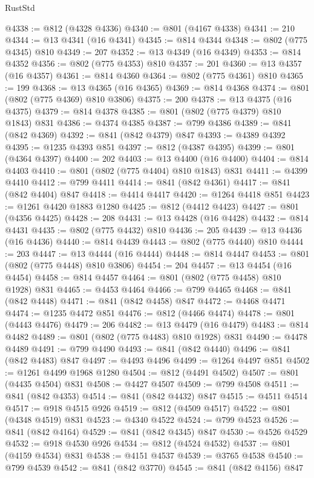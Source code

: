 \begin{lexlean}{RustStd}
\begin{coremodule}
@4338 := @812 (@4328 @4336)
@4340 := @801 (@4167 @4338)
@4341 := 210
@4344 := @13 @4341 (@16 @4341)
@4345 := @814 @4344
@4348 := @802 (@775 @4345) @810
@4349 := 207
@4352 := @13 @4349 (@16 @4349)
@4353 := @814 @4352
@4356 := @802 (@775 @4353) @810
@4357 := 201
@4360 := @13 @4357 (@16 @4357)
@4361 := @814 @4360
@4364 := @802 (@775 @4361) @810
@4365 := 199
@4368 := @13 @4365 (@16 @4365)
@4369 := @814 @4368
@4374 := @801 (@802 (@775 @4369) @810 @3806)
@4375 := 200
@4378 := @13 @4375 (@16 @4375)
@4379 := @814 @4378
@4385 := @801 (@802 (@775 @4379) @810 @1843) @831
@4386 := @4374 @4385
@4387 := @799 @4386
@4389 := @841 (@842 @4369)
@4392 := @841 (@842 @4379) @847
@4393 := @4389 @4392
@4395 := @1235 @4393 @851
@4397 := @812 (@4387 @4395)
@4399 := @801 (@4364 @4397)
@4400 := 202
@4403 := @13 @4400 (@16 @4400)
@4404 := @814 @4403
@4410 := @801 (@802 (@775 @4404) @810 @1843) @831
@4411 := @4399 @4410
@4412 := @799 @4411
@4414 := @841 (@842 @4361)
@4417 := @841 (@842 @4404) @847
@4418 := @4414 @4417
@4420 := @1264 @4418 @851
@4423 := @1261 @4420 @1883 @1280
@4425 := @812 (@4412 @4423)
@4427 := @801 (@4356 @4425)
@4428 := 208
@4431 := @13 @4428 (@16 @4428)
@4432 := @814 @4431
@4435 := @802 (@775 @4432) @810
@4436 := 205
@4439 := @13 @4436 (@16 @4436)
@4440 := @814 @4439
@4443 := @802 (@775 @4440) @810
@4444 := 203
@4447 := @13 @4444 (@16 @4444)
@4448 := @814 @4447
@4453 := @801 (@802 (@775 @4448) @810 @3806)
@4454 := 204
@4457 := @13 @4454 (@16 @4454)
@4458 := @814 @4457
@4464 := @801 (@802 (@775 @4458) @810 @1928) @831
@4465 := @4453 @4464
@4466 := @799 @4465
@4468 := @841 (@842 @4448)
@4471 := @841 (@842 @4458) @847
@4472 := @4468 @4471
@4474 := @1235 @4472 @851
@4476 := @812 (@4466 @4474)
@4478 := @801 (@4443 @4476)
@4479 := 206
@4482 := @13 @4479 (@16 @4479)
@4483 := @814 @4482
@4489 := @801 (@802 (@775 @4483) @810 @1928) @831
@4490 := @4478 @4489
@4491 := @799 @4490
@4493 := @841 (@842 @4440)
@4496 := @841 (@842 @4483) @847
@4497 := @4493 @4496
@4499 := @1264 @4497 @851
@4502 := @1261 @4499 @1968 @1280
@4504 := @812 (@4491 @4502)
@4507 := @801 (@4435 @4504) @831
@4508 := @4427 @4507
@4509 := @799 @4508
@4511 := @841 (@842 @4353)
@4514 := @841 (@842 @4432) @847
@4515 := @4511 @4514
@4517 := @918 @4515 @926
@4519 := @812 (@4509 @4517)
@4522 := @801 (@4348 @4519) @831
@4523 := @4340 @4522
@4524 := @799 @4523
@4526 := @841 (@842 @4164)
@4529 := @841 (@842 @4345) @847
@4530 := @4526 @4529
@4532 := @918 @4530 @926
@4534 := @812 (@4524 @4532)
@4537 := @801 (@4159 @4534) @831
@4538 := @4151 @4537
@4539 := @3765 @4538
@4540 := @799 @4539
@4542 := @841 (@842 @3770)
@4545 := @841 (@842 @4156) @847

\end{coremodule}
\end{lexlean}
